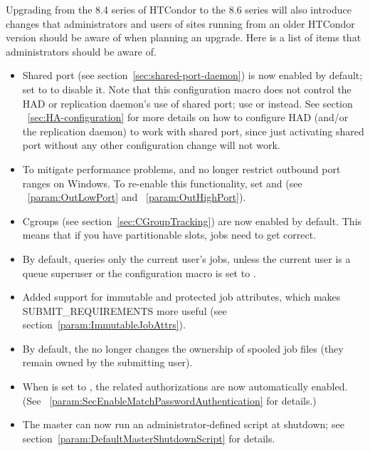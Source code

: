 Upgrading from the 8.4 series of HTCondor to the 8.6 series will
also introduce changes that administrators and users of sites running
from an older HTCondor version should be aware of when planning an upgrade.
Here is a list of items that administrators should be aware of.

\begin{itemize}

\item Shared port (see section~\ref{sec:shared-port-daemon}) is now
enabled by default; set  to  to
disable it.  Note that this configuration macro does not control the HAD or
replication daemon's use of shared port; use 
or  instead.  See section
~\ref{sec:HA-configuration} for more details on how to configure HAD (and/or
the replication daemon) to work with shared port, since just activating
shared port without any other configuration change will not work.

\item To mitigate performance problems,  and
 no longer restrict outbound port ranges on Windows.  To
re-enable this functionality, set  and
 (see ~\ref{param:OutLowPort} and
~\ref{param:OutHighPort}).

\item Cgroups (see section~\ref{sec:CGroupTracking}) are now enabled
by default.  This means that if you
have partitionable slots, jobs need to get 
correct.

\item By default,  queries only the current user's jobs,
unless the current user is a queue superuser or the
 configuration macro is set to
.

\item Added support for immutable and protected job attributes, which
makes SUBMIT\_REQUIREMENTS more useful
(see section~\ref{param:ImmutableJobAttrs}).

\item By default, the  no longer changes the ownership
of spooled job files (they remain owned by the submitting user).

\item When  is set
to , the related authorizations are now automatically enabled.
  (See ~\ref{param:SecEnableMatchPasswordAuthentication}
for details.)

\item The master can now run an administrator-defined script at shutdown;
see section~\ref{param:DefaultMasterShutdownScript} for details.

\end{itemize}

